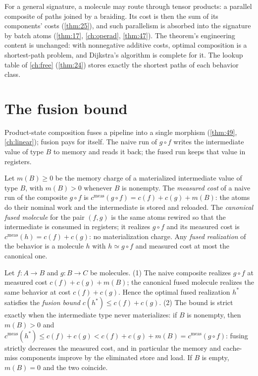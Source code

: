 \begin{remark}
For a general signature, a molecule may route through tensor products: a
parallel composite of paths joined by a braiding. Its cost is then the sum of
its components' costs (\autoref{thm:25}), and such parallelism is absorbed into the
signature by batch atoms (\autoref{thm:17}, \autoref{ch:operad}, \autoref{thm:47}). The theorem's
engineering content is unchanged: with nonnegative additive costs, optimal
composition is a shortest-path problem, and Dijkstra's algorithm is complete
for it. The lookup table of \autoref{ch:free} (\autoref{thm:24}) stores exactly the
shortest paths of each behavior class.
\end{remark}

\section{The fusion bound}\label{sec:enrich-fusion}

Product-state composition fuses a pipeline into a single morphism (\autoref{thm:49},
\autoref{ch:linear}); fusion pays for itself. The naive run of $g \circ f$
writes the intermediate value of type $B$ to memory and reads it back; the
fused run keeps that value in registers.

\begin{definition}\label{def:measured}
Let $m (B) \ge 0$ be the memory charge of a materialized intermediate value of
type $B$, with $m (B) > 0$ whenever $B$ is nonempty. The \emph{measured cost}
of a naive run of the composite $g \circ f$ is
$c^{\mathrm{meas}} (g \circ f) = c (f) + c (g) + m (B)$: the atoms do their nominal
work and the intermediate is stored and reloaded. The \emph{canonical fused
molecule} for the pair $(f, g)$ is the same atoms rewired so that the
intermediate is consumed in registers; it realizes $g \circ f$ and its
measured cost is $c^{\mathrm{meas}} (h) = c (f) + c (g)$: no materialization
charge. Any \emph{fused realization} of the behavior is a molecule $h$ with
$h \simeq g \circ f$ and measured cost at most the canonical one.
\end{definition}

\begin{theorem}\label{thm:27}
 Let $f \colon A \to B$ and $g \colon B \to C$ be molecules.
(1) The naive composite realizes $g \circ f$ at measured cost
$c (f) + c (g) + m (B)$; the canonical fused molecule realizes the same behavior
at cost $c (f) + c (g)$. Hence the optimal fused realization $h^{*}$ satisfies
the \emph{fusion bound} $c (h^{*}) \le c (f) + c (g)$.
(2) The bound is strict exactly when the intermediate type never materializes:
if $B$ is nonempty, then $m (B) > 0$ and
$c^{\mathrm{meas}} (h^{*}) \le c (f) + c (g) < c (f) + c (g) + m (B) =
c^{\mathrm{meas}} (g \circ f)$: fusing strictly decreases the measured cost,
and in particular the memory and cache-miss components improve by the
eliminated store and load. If $B$ is empty, $m (B) = 0$ and the two coincide.
\end{theorem}

